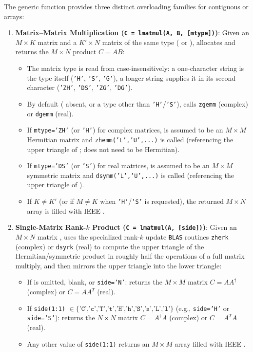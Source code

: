 The generic function  provides three distinct overloading families for contiguous  or  arrays:
\begin{enumerate}
  \item \textbf{Matrix--Matrix Multiplication (\texttt{C = lmatmul(A, B, [mtype])})}:
  Given an $M\times K$ matrix  and a $K'\times N$ matrix  of the same type ( or ), allocates and returns the $M\times N$ product $C = A B$:
  \begin{itemize}
    \item The matrix type is read from  case-insensitively: a one-character string is the type itself (\texttt{'H'}, \texttt{'S'}, \texttt{'G'}), a longer string supplies it in its second character (\texttt{'ZH'}, \texttt{'DS'}, \texttt{'ZG'}, \texttt{'DG'}).
    \item By default ( absent, or a type other than \texttt{'H'}/\texttt{'S'}), calls \texttt{zgemm} (complex) or \texttt{dgemm} (real).
    \item If \texttt{mtype='ZH'} (or \texttt{'H'}) for complex matrices,  is assumed to be an $M\times M$ Hermitian matrix and \texttt{zhemm('L','U',...)} is called (referencing the upper triangle of ;  does not need to be Hermitian).
    \item If \texttt{mtype='DS'} (or \texttt{'S'}) for real matrices,  is assumed to be an $M\times M$ symmetric matrix and \texttt{dsymm('L','U',...)} is called (referencing the upper triangle of ).
    \item If $K \neq K'$ (or if $M \neq K$ when \texttt{'H'}/\texttt{'S'} is requested), the returned $M\times N$ array is filled with IEEE .
  \end{itemize}

  \item \textbf{Single-Matrix Rank-$k$ Product (\texttt{C = lmatmul(A, [side])})}:
  Given an $M\times N$ matrix , uses the specialized rank-$k$ update \texttt{BLAS} routines \texttt{zherk} (complex) or \texttt{dsyrk} (real) to compute the upper triangle of the Hermitian/symmetric product in roughly half the operations of a full matrix multiply, and then mirrors the upper triangle into the lower triangle:
  \begin{itemize}
    \item If  is omitted, blank, or \texttt{side='N'}: returns the $M\times M$ matrix $C = A A^\dagger$ (complex) or $C = A A^T$ (real).
    \item If \texttt{side(1:1)} $\in \{\texttt{'C','c','T','t','H','h','S','s','L','l'}\}$ (e.g., \texttt{side='H'} or \texttt{side='S'}): returns the $N\times N$ matrix $C = A^\dagger A$ (complex) or $C = A^T A$ (real).
    \item Any other value of \texttt{side(1:1)} returns an $M\times M$ array filled with IEEE .
  \end{itemize}


\end{enumerate}
